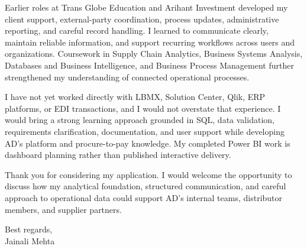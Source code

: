 \documentclass[letterpaper,11pt]{article}
\begin{document}
\bigbreak
Earlier roles at Trans Globe Education and Arihant Investment developed my client support, external-party coordination, process updates, administrative reporting, and careful record handling. I learned to communicate clearly, maintain reliable information, and support recurring workflows across users and organizations. Coursework in Supply Chain Analytics, Business Systems Analysis, Databases and Business Intelligence, and Business Process Management further strengthened my understanding of connected operational processes.

\bigbreak
I have not yet worked directly with LBMX, Solution Center, Qlik, ERP platforms, or EDI transactions, and I would not overstate that experience. I would bring a strong learning approach grounded in SQL, data validation, requirements clarification, documentation, and user support while developing AD's platform and procure-to-pay knowledge. My completed Power BI work is dashboard planning rather than published interactive delivery.

\bigbreak
Thank you for considering my application. I would welcome the opportunity to discuss how my analytical foundation, structured communication, and careful approach to operational data could support AD's internal teams, distributor members, and supplier partners.

\bigbreak
Best regards,\\
Jainali Mehta
\end{document}
